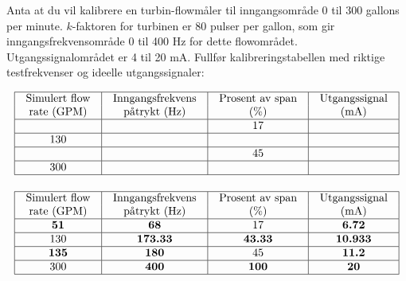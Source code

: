 

Anta at du vil kalibrere en turbin-flowmåler til inngangsområde 0 til 300 gallons per minute. $k$-faktoren for turbinen er 80 pulser per gallon, som gir inngangsfrekvensområde 0 til 400 Hz for dette flowområdet. Utgangssignalområdet er 4 til 20 mA. Fullfør kalibreringstabellen med riktige testfrekvenser og ideelle utgangssignaler:


$$\vbox{\offinterlineskip
\halign{\strut
\vrule \quad\hfil # \ \hfil &
\vrule \quad\hfil # \ \hfil &
\vrule \quad\hfil # \ \hfil &
\vrule \quad\hfil # \ \hfil \vrule \cr
\noalign{\hrule}
%
Simulert flow & Inngangsfrekvens & Prosent av span & Utgangssignal \cr
%
rate (GPM) & påtrykt (Hz) & (\%) & (mA) \cr
%
\noalign{\hrule}
%
 &  & 17 &  \cr
%
\noalign{\hrule}
%
130 &  &  &  \cr
%
\noalign{\hrule}
%
 &  & 45 &  \cr
%
\noalign{\hrule}
%
300 &  &  &  \cr
%
\noalign{\hrule}
} %
}$$ %








$$\vbox{\offinterlineskip
\halign{\strut
\vrule \quad\hfil # \ \hfil &
\vrule \quad\hfil # \ \hfil &
\vrule \quad\hfil # \ \hfil &
\vrule \quad\hfil # \ \hfil \vrule \cr
\noalign{\hrule}
%
Simulert flow & Inngangsfrekvens & Prosent av span & Utgangssignal \cr
%
rate (GPM) & påtrykt (Hz) & (\%) & (mA) \cr
%
\noalign{\hrule}
%
{\bf 51} & {\bf 68} & 17 & {\bf 6.72} \cr
%
\noalign{\hrule}
%
130 & {\bf 173.33} & {\bf 43.33} & {\bf 10.933} \cr
%
\noalign{\hrule}
%
{\bf 135} & {\bf 180} & 45 & {\bf 11.2} \cr
%
\noalign{\hrule}
%
300 & {\bf 400} & {\bf 100} & {\bf 20} \cr
%
\noalign{\hrule}
} %
}$$ %







